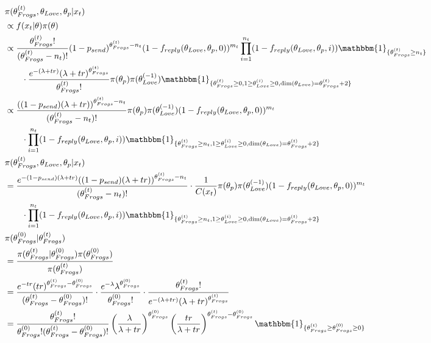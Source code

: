 \documentclass[10pt, a4paper]{article}
\begin{document}
    \begin{align*}
        &\pi(\theta_{Frogs}^{(t)}, \theta_{Love}, \theta_p|x_t) \\
        &\propto f(x_t|\theta)\pi(\theta) \\
        &\propto \frac{\theta_{Frogs}^{(t)}!}{(\theta_{Frogs}^{(t)} - n_t)!}(1-p_{send})^{\theta_{Frogs}^{(t)}-n_t} (1-f_{reply}(\theta_{Love}, \theta_{p}, 0))^{m_t}\prod_{i=1}^{n_t} (1-f_{reply}(\theta_{Love}, \theta_{p}, i)) \mathbbm{1}_{\{\theta_{Frogs}^{(t)}\geq n_t\}} \\&\qquad\cdot \frac{e^{-(\lambda+tr)}(\lambda+tr)^{\theta_{Frogs}^{(t)}}}{\theta_{Frogs}^{(t)}!}\pi(\theta_p)\pi(\theta_{Love}^{(-1)}) \mathbbm{1}_{\{\theta_{Frogs}^{(t)} \geq 0, 1\geq\theta_{Love}^{(i)}\geq 0, \dim(\theta_{Love}) = \theta_{Frogs}^{(t)}+2\}} \\
        &\propto \frac{((1-p_{send})(\lambda+tr))^{\theta_{Frogs}^{(t)} - n_t}}{(\theta_{Frogs}^{(t)}-n_t)!} \pi(\theta_p)\pi(\theta_{Love}^{(-1)}) (1-f_{reply}(\theta_{Love}, \theta_{p}, 0))^{m_t}\\&\qquad\cdot\prod_{i=1}^{n_t} (1-f_{reply}(\theta_{Love}, \theta_{p}, i)) \mathbbm{1}_{\{\theta_{Frogs}^{(t)}\geq n_t, 1\geq\theta_{Love}^{(i)}\geq 0, \dim(\theta_{Love}) = \theta_{Frogs}^{(t)}+2\}} \\
        &\pi(\theta_{Frogs}^{(t)}, \theta_{Love}, \theta_p|x_t) \\
        &= \frac{e^{-(1-p_{send})(\lambda+tr)}((1-p_{send})(\lambda+tr))^{\theta_{Frogs}^{(t)} - n_t}}{(\theta_{Frogs}^{(t)}-n_t)!} \cdot\frac{1}{C(x_t)}\pi(\theta_p)\pi(\theta_{Love}^{(-1)}) (1-f_{reply}(\theta_{Love}, \theta_{p}, 0))^{m_t}\\&\qquad\cdot\prod_{i=1}^{n_t} (1-f_{reply}(\theta_{Love}, \theta_{p}, i)) \mathbbm{1}_{\{\theta_{Frogs}^{(t)}\geq n_t, 1\geq\theta_{Love}^{(i)}\geq 0, \dim(\theta_{Love}) = \theta_{Frogs}^{(t)}+2\}} \\
        &\pi(\theta_{Frogs}^{(0)}|\theta_{Frogs}^{(t)}) \\
        &= \frac{\pi(\theta_{Frogs}^{(t)}|\theta_{Frogs}^{(0)})\pi(\theta_{Frogs}^{(0)})}{\pi(\theta_{Frogs}^{(t)})} \\
        &= \frac{e^{-tr}(tr)^{\theta_{Frogs}^{(t)}-\theta_{Frogs}^{(0)}}}{(\theta_{Frogs}^{(t)}-\theta_{Frogs}^{(0)})!}\cdot \frac{e^{-\lambda}\lambda^{\theta_{Frogs}^{(0)}}}{\theta_{Frogs}^{(0)}!} \cdot \frac{\theta_{Frogs}^{(t)}!}{e^{-(\lambda+tr)}(\lambda+tr)^{\theta_{Frogs}^{(t)}}} \\
        &= \frac{\theta_{Frogs}^{(t)}!}{\theta_{Frogs}^{(0)}!(\theta_{Frogs}^{(t)}-\theta_{Frogs}^{(0)})!} \left(\frac{\lambda}{\lambda+tr}\right)^{\theta_{Frogs}^{(0)}}\left(\frac{tr}{\lambda+tr}\right)^{\theta_{Frogs}^{(t)}-\theta_{Frogs}^{(0)}} \mathbbm{1}_{\{\theta_{Frogs}^{(t)}\geq\theta_{Frogs}^{(0)}\geq0\}}\\

\end{align*}
\end{document}
